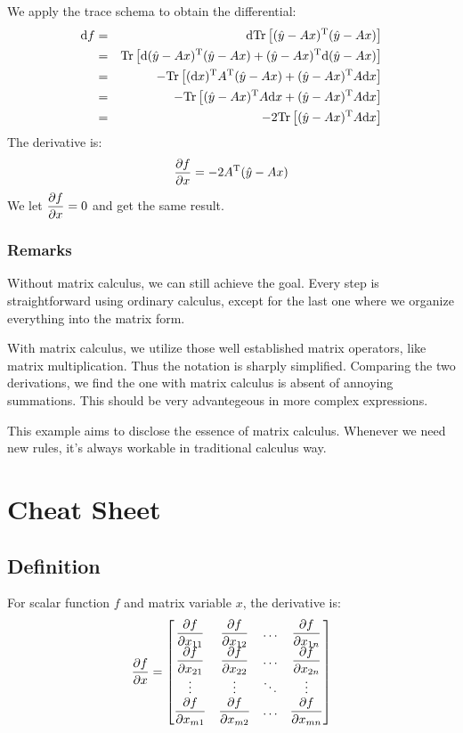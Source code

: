 We apply the trace schema to obtain the differential:
\begin{eqnarray}
	\mathrm{d}f 
	&=& \mathrm{d}\mathrm{Tr}\left[ (\hat{y} - Ax)^\mathrm{T}(\hat{y} - Ax) \right] \\
	&=& \mathrm{Tr}\left[ \mathrm{d}(\hat{y} - Ax)^\mathrm{T}(\hat{y} - Ax)
		+ (\hat{y} - Ax)^\mathrm{T} \mathrm{d}(\hat{y} - Ax) \right] \\
	&=& - \mathrm{Tr}\left[ (\mathrm{d}x)^\mathrm{T} A^\mathrm{T} (\hat{y} - Ax)
		+ (\hat{y} - Ax)^\mathrm{T} A \mathrm{d}x\right] \\
	&=& - \mathrm{Tr}\left[ (\hat{y} - Ax)^\mathrm{T} A \mathrm{d}x
		+ (\hat{y} - Ax)^\mathrm{T} A \mathrm{d}x\right] \\
	&=& -2 \mathrm{Tr}\left[ (\hat{y} - Ax)^\mathrm{T} A \mathrm{d}x\right] 
\end{eqnarray}
The derivative is:
\begin{equation}
	\dfrac{\partial f}{\partial x} = -2 A^\mathrm{T}(\hat{y} - Ax)
\end{equation}
We let $\dfrac{\partial f}{\partial x}=0$ and get the same result. 

\subsubsection{Remarks}

Without matrix calculus, we can still achieve the 
goal. Every step is straightforward using ordinary 
calculus, except for the last one where we organize 
everything into the matrix form. 

With matrix calculus, we utilize those well established 
matrix operators, like matrix multiplication. Thus
the notation is sharply simplified. Comparing the two 
derivations, we find the one with matrix calculus 
is absent of annoying summations. This should be very 
advantegeous in more complex expressions. 

This example aims to disclose the essence of matrix calculus.
Whenever we need new rules, it's always workable in 
traditional calculus way. 

\section{Cheat Sheet}
\label{sec:cheat}

\subsection{Definition}

For scalar function $f$ and matrix variable $x$, the derivative is:
	\begin{equation}
		\dfrac{\partial f}{\partial x} = 
		\left[
		\begin{matrix}
			\dfrac{\partial f}{\partial x_{11}} & \dfrac{\partial f}{\partial x_{12}} & \ldots &\dfrac{\partial f}{\partial x_{1n}}\\
			\dfrac{\partial f}{\partial x_{21}} & \dfrac{\partial f}{\partial x_{22}} & \ldots &\dfrac{\partial f}{\partial x_{2n}}\\
			\vdots & \vdots & \ddots & \vdots \\
			\dfrac{\partial f}{\partial x_{m1}} & \dfrac{\partial f}{\partial x_{m2}} & \ldots &\dfrac{\partial f}{\partial x_{mn}}\\
		\end{matrix}
		\right]
	\end{equation}

